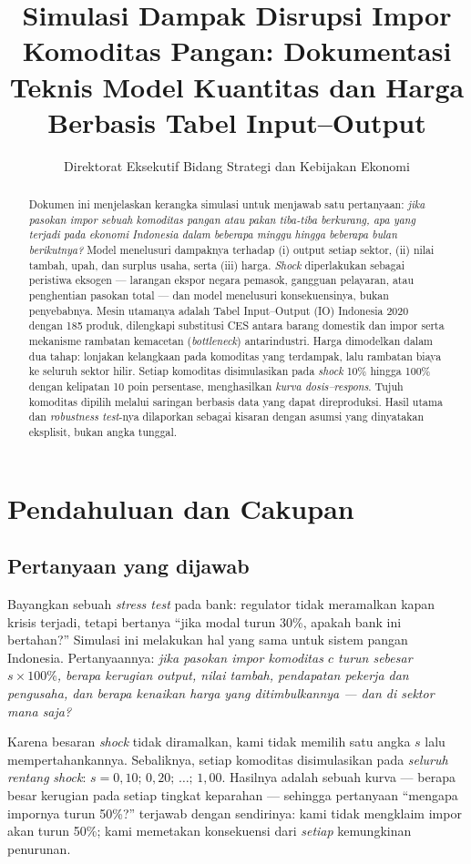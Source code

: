 \documentclass[
  manuscript=article,
  layout=publish,
  year=2026,
  volume=1,
]{den}
\title{Simulasi Dampak Disrupsi Impor Komoditas Pangan: Dokumentasi
Teknis Model Kuantitas dan Harga Berbasis Tabel Input--Output}
\author{Direktorat Eksekutif Bidang Strategi dan Kebijakan Ekonomi}
\affiliation{Dewan Ekonomi Nasional}
\begin{document}
\begin{abstract}
Dokumen ini menjelaskan kerangka simulasi untuk menjawab satu
pertanyaan: \emph{jika pasokan impor sebuah komoditas pangan atau pakan
tiba-tiba berkurang, apa yang terjadi pada ekonomi Indonesia dalam
beberapa minggu hingga beberapa bulan berikutnya?} Model menelusuri
dampaknya terhadap (i) output setiap sektor, (ii) nilai tambah, upah,
dan surplus usaha, serta (iii) harga. \emph{Shock} diperlakukan sebagai
peristiwa eksogen --- larangan ekspor negara pemasok, gangguan
pelayaran, atau penghentian pasokan total --- dan model menelusuri
konsekuensinya, bukan penyebabnya. Mesin utamanya adalah Tabel
Input--Output (IO) Indonesia 2020 dengan 185 produk, dilengkapi
substitusi CES antara barang domestik dan impor serta mekanisme rambatan
kemacetan (\emph{bottleneck}) antarindustri. Harga dimodelkan dalam dua
tahap: lonjakan kelangkaan pada komoditas yang terdampak, lalu rambatan
biaya ke seluruh sektor hilir. Setiap komoditas disimulasikan pada
\emph{shock} 10\% hingga 100\% dengan kelipatan 10 poin persentase,
menghasilkan \emph{kurva dosis--respons}. Tujuh komoditas dipilih
melalui saringan berbasis data yang dapat direproduksi. Hasil utama dan
\emph{robustness test}-nya dilaporkan sebagai kisaran dengan asumsi yang
dinyatakan eksplisit, bukan angka tunggal.
\end{abstract}

\tableofcontents
\clearpage

\section{Pendahuluan dan Cakupan}\label{pendahuluan-dan-cakupan}

\subsection{Pertanyaan yang dijawab}\label{pertanyaan-yang-dijawab}

Bayangkan sebuah \emph{stress test} pada bank: regulator tidak
meramalkan kapan krisis terjadi, tetapi bertanya ``jika modal turun
30\%, apakah bank ini bertahan?'' Simulasi ini melakukan hal yang sama
untuk sistem pangan Indonesia. Pertanyaannya: \emph{jika pasokan impor
komoditas \(c\) turun sebesar \(s \times 100\%\), berapa kerugian
output, nilai tambah, pendapatan pekerja dan pengusaha, dan berapa
kenaikan harga yang ditimbulkannya --- dan di sektor mana saja?}

Karena besaran \emph{shock} tidak diramalkan, kami tidak memilih satu
angka \(s\) lalu mempertahankannya. Sebaliknya, setiap komoditas
disimulasikan pada \emph{seluruh rentang} \emph{shock}:
\(s = 0{,}10;\, 0{,}20;\, \ldots;\, 1{,}00\). Hasilnya adalah sebuah
kurva --- berapa besar kerugian pada setiap tingkat keparahan ---
sehingga pertanyaan ``mengapa impornya turun 50\%?'' terjawab dengan
sendirinya: kami tidak mengklaim impor akan turun 50\%; kami memetakan
konsekuensi dari \emph{setiap} kemungkinan penurunan.
\end{document}
